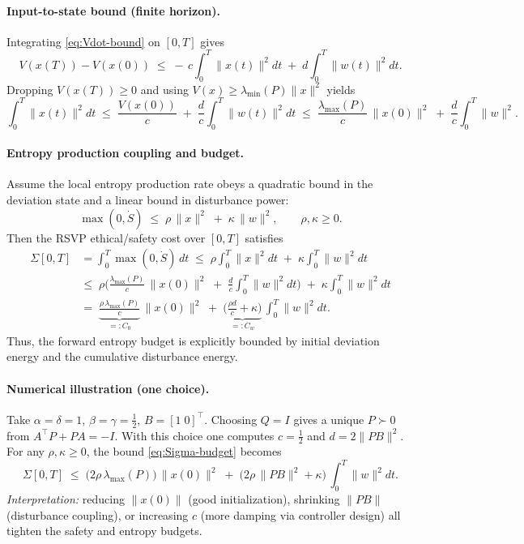 \documentclass[12pt]{article}
\begin{document}
\paragraph{Input-to-state bound (finite horizon).}
Integrating \eqref{eq:Vdot-bound} on $[0,T]$ gives
\begin{equation}
V(x(T)) - V(x(0))
\;\le\; -\,c \int_0^T \|x(t)\|^2 dt \;+\; d \int_0^T \|w(t)\|^2 dt .
\end{equation}
Dropping $V(x(T))\ge 0$ and using $V(x)\ge \lambda_{\min}(P)\|x\|^2$ yields
\begin{equation}
\int_0^T \|x(t)\|^2 dt
\;\le\; \frac{V(x(0))}{c}
\;+\; \frac{d}{c}\int_0^T \|w(t)\|^2 dt
\;\le\; \frac{\lambda_{\max}(P)}{c}\,\|x(0)\|^2
\;+\; \frac{d}{c}\int_0^T \|w\|^2 .
\label{eq:L2state-bound}
\end{equation}

\paragraph{Entropy production coupling and budget.}
Assume the local entropy production rate obeys a quadratic bound in the deviation state and a linear bound in disturbance power:
\begin{equation}
\max(0,\dot S)\;\le\; \rho\,\|x\|^2 \;+\; \kappa\,\|w\|^2,
\qquad \rho,\kappa \ge 0 .
\label{eq:Sdot-bound}
\end{equation}
Then the RSVP ethical/safety cost over $[0,T]$ satisfies
\begin{align}
\Sigma[0,T]
&= \int_0^T \max(0,\dot S)\,dt
\;\le\; \rho \int_0^T \|x\|^2 dt \;+\; \kappa \int_0^T \|w\|^2 dt \nonumber\\
&\le\; \rho\Big(\frac{\lambda_{\max}(P)}{c}\,\|x(0)\|^2
\;+\; \frac{d}{c}\int_0^T \|w\|^2 dt\Big)
\;+\; \kappa \int_0^T \|w\|^2 dt \nonumber\\
&=\; \underbrace{\frac{\rho\,\lambda_{\max}(P)}{c}}_{=:C_0}\,\|x(0)\|^2
\;+\; \underbrace{\Big(\frac{\rho d}{c}+\kappa\Big)}_{=:C_w}\,\int_0^T \|w\|^2 dt .
\label{eq:Sigma-budget}
\end{align}
Thus, the forward entropy budget is explicitly bounded by initial deviation energy and the cumulative disturbance energy.

\paragraph{Numerical illustration (one choice).}
Take $\alpha=\delta=1$, $\beta=\gamma=\tfrac{1}{2}$, $B=[1\;0]^\top$. Choosing $Q=I$ gives a unique $P\succ0$
from $A^\top P+PA=-I$. With this choice one computes $c=\tfrac{1}{2}$ and $d=2\|P B\|^2$.
For any $\rho,\kappa\ge0$, the bound \eqref{eq:Sigma-budget} becomes
\[
\Sigma[0,T]\;\le\;
\big(2\rho\,\lambda_{\max}(P)\big)\,\|x(0)\|^2 \;+\; \big(2\rho\,\|P B\|^2+\kappa\big)\,\!\int_0^T \! \|w\|^2 dt .
\]
\emph{Interpretation:} reducing $\|x(0)\|$ (good initialization), shrinking $\|P B\|$ (disturbance coupling), or increasing $c$ (more damping via controller design) all tighten the safety and entropy budgets.
\end{document}

